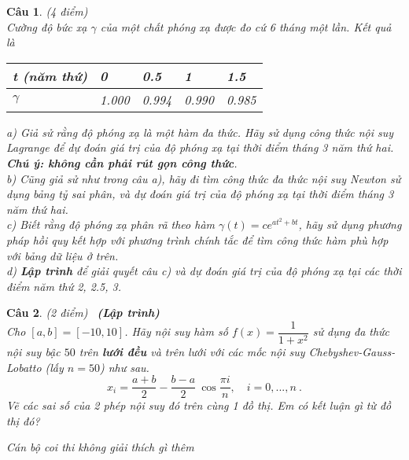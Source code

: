 \documentclass[10pt]{article}
\newtheorem{bt}{Câu}
\begin{document}
\begin{bt}(4 điểm) \\
Cường độ bức xạ $\gamma$ của một chất phóng xạ được đo cứ 6 tháng một lần. Kết quả là
	\begin{center}
		\begin{tabular}[7]{|l|l|l|l|l|} \hline
			t (năm thứ) &  0 & 0.5 & 1 & 1.5 \\ \hline
			$\gamma$ &  1.000 & 0.994 & 0.990 & 0.985  \\ \hline
		\end{tabular}	
	\end{center}
a) Giả sử rằng độ phóng xạ là một hàm đa thức. Hãy sử dụng công thức nội suy Lagrange để dự đoán giá trị của độ phóng xạ tại thời điểm tháng 3 năm thứ hai. \textbf{Chú ý: không cần phải rút gọn công thức}. \\
b) Cũng giả sử như trong câu a), hãy đi tìm công thức đa thức nội suy Newton sử dụng bảng tỷ sai phân, và dự đoán giá trị của độ phóng xạ tại thời điểm tháng 3 năm thứ hai. \\
c) Biết rằng độ phóng xạ phân rã theo hàm $\gamma(t) = c e^{a t^2 + bt}$, hãy sử dụng phương pháp hồi quy kết hợp với phương trình chính tắc để tìm công thức hàm phù hợp với bảng dữ liệu ở trên. \\
d) \textbf{Lập trình} để giải quyết câu c) và dự đoán giá trị của độ phóng xạ tại các thời điểm năm thứ 2, 2.5, 3.   
\end{bt}

\begin{bt}(2 điểm) \ \textbf{(Lập trình)} \\
Cho $[a,b] = [-10,10]$. Hãy nội suy hàm số $f(x) = \dfrac{1}{1 + x^2}$ sử dụng đa thức nội suy bậc $50$ trên \textbf{lưới đều} và trên lưới với các mốc nội suy Chebyshev-Gauss-Lobatto (lấy $n = 50$) như sau. 
%
\[
x_i = \dfrac{a+b}{2} - \dfrac{b-a}{2} \ \cos\dfrac{\pi i}{n}, \quad i = 0, . . . , n \ .
\]
%
Vẽ các sai số của 2 phép nội suy đó trên cùng 1 đồ thị. Em có kết luận gì từ đồ thị đó?
\end{bt}

\vspace{1cm}
 {\it Cán bộ coi thi không giải thích gì thêm}\\
\end{document}
